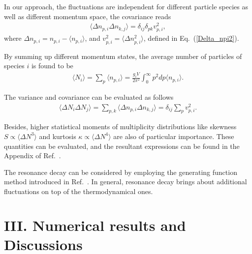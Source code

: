 \documentclass[secnumarabic, graphics,floatfix, nofootinbib,tightenlines,nobibnotes, aps, prl, 12pt]{revtex4-1}
\begin{document}
In our approach, the fluctuations are independent for different particle species as well as different momentum space, the covariance reads
\begin{eqnarray}
\langle \Delta n_{p,i} \Delta n_{k,j} \rangle = \delta_{ij}\delta_{pk}v_{p,i}^2 , \label{covnpi}
\end{eqnarray}
where $\Delta n_{p,i} = n_{p,i} - \langle n_{p,i}\rangle$, and $v_{p,i}^2=\langle \Delta n_{p,i}^2 \rangle$, defined in Eq.~(\ref{Delta_npi2}).

By summing up different momentum states, the average number of particles of species $i$ is found to be
\begin{eqnarray}
\langle N_{i} \rangle= \sum_p \langle n_{p,i} \rangle = \frac{g_i V}{2\pi^2}\int_0^{\infty} p^2 dp \langle n_{p,i} \rangle . \label{avgNi}
\end{eqnarray}

The variance and covariance can be evaluated as follows
\begin{eqnarray}
\langle \Delta N_{i}\Delta N_{j} \rangle= \sum_{p,k} \langle \Delta n_{p,i}\Delta n_{k,j} \rangle = \delta_{ij}\sum_p v_{p,i}^2 .\label{thermoCovariance}
\end{eqnarray}

Besides, higher statistical moments of multiplicity distributions like skewness $S\propto \langle \Delta N^3\rangle$ and kurtosis $\kappa \propto \langle \Delta N^4\rangle$ are also of particular importance.
These quantities can be evaluated, and the resultant expressions can be found in the Appendix of Ref.~\cite{sph-bes-01}.

The resonance decay can be considered by employing the generating function method introduced in Ref.~\cite{statistical-model-03}.
In general, resonance decay brings about additional fluctuations on top of the thermodynamical ones.

\section{III. Numerical results and Discussions}
\end{document}
